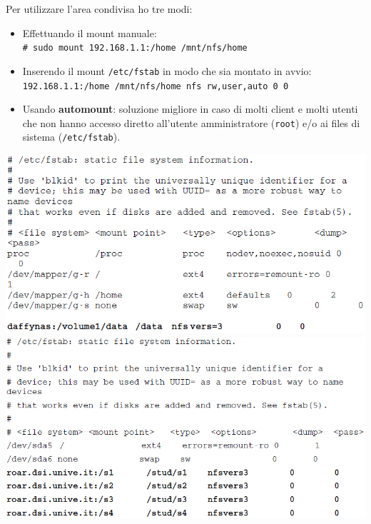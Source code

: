 \documentclass[a4paper]{report}
\newcommand\tab[1][1cm]{\hspace*{#1}}
\begin{document}
Per utilizzare l'area condivisa ho tre modi:
\begin{itemize}
\item Effettuando il mount manuale:\\
	\tab\texttt{\# sudo mount 192.168.1.1:/home /mnt/nfs/home}
\item Inserendo il mount \texttt{/etc/fstab} in modo che sia montato in avvio:\\
	\tab\texttt{192.168.1.1:/home /mnt/nfs/home nfs rw,user,auto 0 0}
\item Usando \textbf{automount}: soluzione migliore in caso di molti client e molti utenti che non hanno accesso diretto all'utente amministratore (\texttt{root}) e/o ai files di sistema (\texttt{/etc/fstab}).
\end{itemize}
\begin{center}
\includegraphics[scale=0.6]{esdfs1.png}\\
\includegraphics[scale=0.6]{esdfs2.png}
\end{center}
\end{document}
